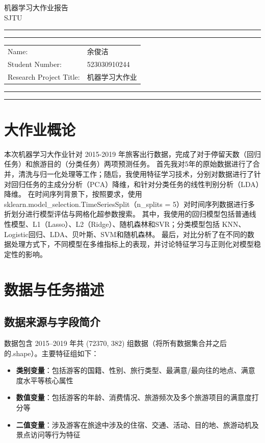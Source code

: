 \documentclass[10pt]{article}
\newcommand{\studentname}{余俊洁}
\newcommand{\studentnumber}{523030910244}
\newcommand{\projecttitle}{机器学习大作业}
\begin{document}
\begin{center}
{\Huge{机器学习大作业报告}} \\
\vspace{2mm}
{\Large{SJTU}}
\end{center}

\vspace{5mm}
\hrule
\vspace{1mm}
\hrule

\vspace{3mm}
\begin{tabular}{ll} 
Name:           	        & {\studentname}   \\ 
Student Number: 	        & {\studentnumber} \\ 
Research Project Title: 	& {\projecttitle}  \\  
\end{tabular}

\vspace{3mm}
\hrule
\vspace{1mm}
\hrule

\tableofcontents
\newpage

\section{大作业概论}
本次机器学习大作业针对 2015-2019 年旅客出行数据，完成了对于停留天数（回归任务）和旅游目的（分类任务）两项预测任务。  
首先我对5年的原始数据进行了合并，清洗与归一化处理等工作；随后，我使用特征学习技术，分别对数据进行了针对回归任务的主成分分析（PCA）降维，和针对分类任务的线性判别分析（LDA）降维。  
在时间序列背景下，按照要求，使用 sklearn.model\_selection.TimeSeriesSplit（n\_splits = 5）对时间序列数据进行多折划分进行模型评估与网格化超参数搜索。  
其中，我使用的回归模型包括普通线性模型、L1（Lasso）、L2（Ridge）、随机森林和SVR；分类模型包括 KNN、Logistic回归、LDA、贝叶斯、SVM和随机森林。  
最后，对比分析了在不同的数据处理方式下，不同模型在多维指标上的表现，并讨论特征学习与正则化对模型稳定性的影响。
\section{数据与任务描述}
\subsection{数据来源与字段简介}
数据包含 2015–2019 年共 (72370, 382) 组数据（将所有数据集合并之后的.shape）。主要特征组如下：
\begin{itemize}
  \item \textbf{类别变量}：包括游客的国籍、性别、旅行类型、最满意/最向往的地点、满意度水平等核心属性
  \item \textbf{数值变量}：包括游客的年龄、消费情况、旅游频次及多个旅游项目的满意度打分等
  \item \textbf{二值变量}：涉及游客在旅途中涉及的住宿、交通、活动、目的地、旅游动机及景点访问等行为特征
\end{itemize}
\end{document}
